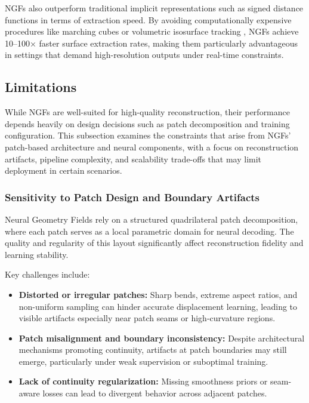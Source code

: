 NGFs also outperform traditional implicit representations such as signed distance functions in terms of extraction speed. 
By avoiding computationally expensive procedures like marching cubes or volumetric isosurface tracking \cite{Mildenhall2020}, NGFs achieve 10--100× faster surface extraction rates, making them particularly advantageous in settings that demand high-resolution outputs under real-time constraints. 

\subsection{Limitations}

While NGFs are well-suited for high-quality reconstruction, their performance depends heavily on design decisions such as patch decomposition and training configuration. 
This subsection examines the constraints that arise from NGFs' patch-based architecture and neural components, with a focus on reconstruction artifacts, pipeline complexity, and scalability trade-offs that may limit deployment in certain scenarios.

\subsubsection{Sensitivity to Patch Design and Boundary Artifacts}

Neural Geometry Fields rely on a structured quadrilateral patch decomposition, where each patch serves as a local parametric domain for neural decoding. 
The quality and regularity of this layout significantly affect reconstruction fidelity and learning stability. 

Key challenges include:
\begin{itemize}
    \item \textbf{Distorted or irregular patches:} Sharp bends, extreme aspect ratios, and non-uniform sampling can hinder accurate displacement learning, leading to visible artifacts especially near patch seams or high-curvature regions.
    \item \textbf{Patch misalignment and boundary inconsistency:} Despite architectural mechanisms promoting continuity, artifacts at patch boundaries may still emerge, particularly under weak supervision or suboptimal training.
    \item \textbf{Lack of continuity regularization:} Missing smoothness priors or seam-aware losses can lead to divergent behavior across adjacent patches.
\end{itemize}

